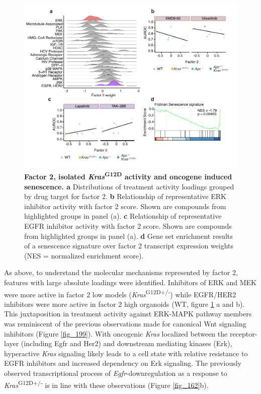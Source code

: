 \begin{flushleft}
\begin{figure}[h!]
\centering
\includegraphics[scale=0.75,
                keepaspectratio]{figures/adenomaprofiling/pdf/fig_3_1_2.pdf}
\caption[Factor 2, isolated \textit{Kras}\textsuperscript{G12D} activity and oncogene induced senescence]{\textbf{Factor 2, isolated \textit{Kras}\textsuperscript{G12D} activity and oncogene induced senescence. a} Distributions of treatment activity loadings grouped by drug target for factor 2. \textbf{b} Relationship of representative ERK inhibitor activity with factor 2 score. Shown are compounds from highlighted groups in panel (a). \textbf{c} Relationship of representative EGFR inhibitor activity with factor 2 score. Shown are compounds from highlighted groups in panel (a). \textbf{d} Gene set enrichment results of a senescence signature \parencite{fridmanCriticalPathwaysCellular2008} over factor 2 transcript expression weights (NES = normalized enrichment score).}
\label{fig_200}
\end{figure}

As above, to understand the molecular mechanisms represented by factor 2, features with large absolute loadings were identified. Inhibitors of ERK and MEK were more active in factor 2 low models (\textit{Kras}\textsuperscript{G12D+/-}) while EGFR/HER2 inhibitors were more active in factor 2 high organoids (WT, figure \ref{fig_200} a and b). This juxtaposition in treatment activity against ERK-MAPK pathway members was reminiscent of the previous observations made for canonical Wnt signaling inhibitors (Figure \ref{fig_199}). With oncogenic \textit{Kras} localized between the receptor-layer (including Egfr and Her2) and downstream mediating kinases (Erk), hyperactive \textit{Kras} signaling likely leads to a cell state with relative resistance to EGFR inhibitors and increased dependency on Erk signaling. The previously observed transcriptional process of \textit{Egfr}-downregulation as a response to \textit{Kras}\textsuperscript{G12D+/-} is in line with these observations (Figure \ref{fig_162}b). 


\end{flushleft}
